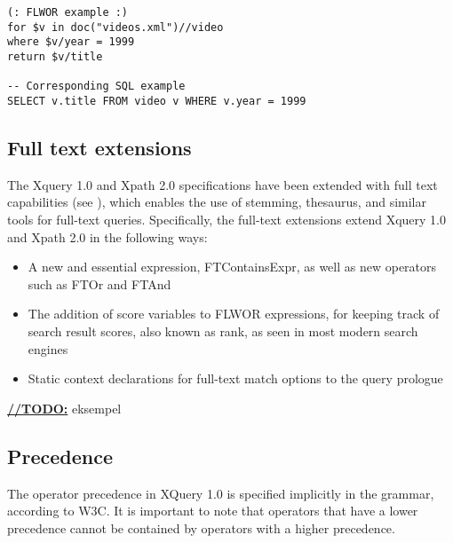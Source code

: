 \begin{Verbatim}
(: FLWOR example :)
for $v in doc("videos.xml")//video
where $v/year = 1999
return $v/title

-- Corresponding SQL example 
SELECT v.title FROM video v WHERE v.year = 1999
\end{Verbatim}

\subsection{Full text extensions}
The Xquery 1.0  and Xpath 2.0 specifications have been extended with full text capabilities (see \cite{w3c02}), which enables the use of stemming, thesaurus, and similar tools for full-text queries. Specifically, the full-text extensions extend Xquery 1.0 and Xpath 2.0 in the following ways:
\begin{itemize}
\item A new and essential expression, FTContainsExpr, as well as new operators such as FTOr and FTAnd
\item The addition of score variables to FLWOR expressions, for keeping track of search result scores, also known as rank, as seen in most modern search engines
\item Static context declarations for full-text match options to the query prologue
\end{itemize}
\underline{\textbf{\LARGE //TODO:}} eksempel

\subsection{Precedence}
\label{sect:xquery:precedence}
The operator precedence in XQuery 1.0 is specified implicitly in the grammar,
according to W3C\cite{w3cprecedence}. It is important to note that operators that 
have a lower precedence cannot be contained by operators with a higher 
precedence.
